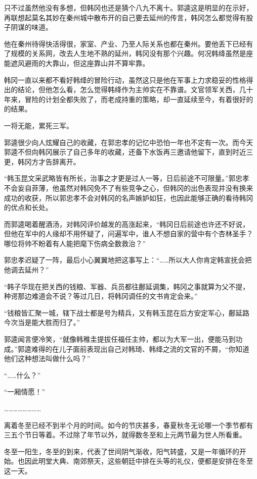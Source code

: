 只不过虽然他没有多想，但韩冈也还是猜个八九不离十。郭逵这是明显的在示好，再联想起莫名其妙在秦州城中散布开的自己要去延州的传言，韩冈怎么都觉得有股子阴谋的味道。

他在秦州待得快活得很，家室、产业、乃至人际关系也都在秦州。要他丢下已经有了规模的关系网，改去人生地不熟的延州，韩冈没有那个兴趣。何况韩绛虽然是座能遮风避雨的大靠山，但这座靠山并不算牢靠。

韩冈一直以来都不看好韩绛的冒险行动，虽然这只是他在军事上力求稳妥的性格得出的结论，但他怎么看，怎么觉得韩绛作为主帅实在不靠谱。文官领军关西，几十年来，冒险的计划全都失败了，而老成持重的策略，却一直延续至今，有着很好的的结果。

一将无能，累死三军。

郭逵很少向人炫耀自己的收藏，在郭忠孝的记忆中恐怕一年也不定有一次。而今天郭逵不但向韩冈展示了自己多年的收藏，还备下水饭再三邀请他留下，直到时近三更，韩冈方才告辞离开。

“韩玉昆文采武略皆有所长，治事之才更是过人一等，日后前途不可限量。”郭忠孝不会妄自菲薄，他虽然对韩冈免不了有些竞争之心，但韩冈的出色表现并没有换来成功的收获，所以郭忠孝不会对韩冈的名声嫉妒如狂，也因此能够正确的看待韩冈的优点和长处。

而郭逵喝着醒酒汤，对韩冈评价越发的高涨起来，“韩冈日后前途也许还不好说，但他在军中的人缘却不用怀疑了，问遍军中，谁人不想自家的营中有个杏林圣手？哪位将帅不盼着有人能把麾下伤病全数救治？”

郭忠孝迟疑了一阵，最后小心翼翼地把这事写上：“……所以大人你肯定韩宣抚会把他调去延州？”

“韩子华现在把关西的钱粮、军器、兵员都往鄜延调集，韩冈之事就算为父不提，种谔那边难道会不说？等过几日，将韩冈调任的文书肯定会来。”

“钱粮皆汇聚一城，辖下战士都是号为精兵，又有韩玉昆在后方安定军心，鄜延路今次当是能大胜而归了。”

郭逵闻言便冷笑，“就像韩稚圭提拔任福任主帅，都以为大军一出，便能马到功成。”郭逵难得的在儿子面前表现出自己对韩琦、韩绛之流的文官的不屑，“你知道他们这种想法叫做什么吗？”

“……什么？”

“一厢情愿！”

……………………

离着冬至已经不到半个月的时间。如今的节庆甚多，春夏秋冬无论哪一个季节都有三五个节日等着。不过除了年节以外，就得数冬至和上元两节最为世人所看重。

冬至一阳生，冬至的到来，代表了世间阴气渐收，阳气转盛，又是一年循环的开始。也因此明堂大典、南郊祭天，这些朝廷中排在头等的礼仪，便都是安排在冬至这一天。

